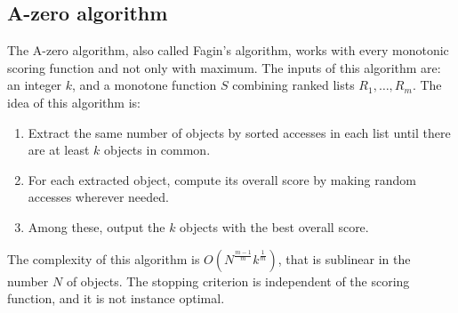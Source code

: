 \documentclass[12pt, a4paper]{report}
\newtheorem[style=M,bodystyle=\normalfont]{theorem}{Theorem}
\newtheorem[style=M,bodystyle=\normalfont]{corollary}{Corollary}
\newtheorem[style=M,bodystyle=\normalfont]{lemma}{Lemma}
\newtheorem[style=M,bodystyle=\normalfont]{definition}{Definition}
\begin{document}
    \subsection{A-zero algorithm}
    The A-zero algorithm, also called Fagin's algorithm, works with every monotonic scoring function and not only with maximum. The inputs
    of this algorithm are: an integer $k$, and a monotone function $S$ combining ranked lists $R_1,\dots,R_m$. The idea of this algorithm is: 
    \begin{enumerate}
        \item Extract the same number of objects by sorted accesses in each list until there are at least $k$ objects in common. 
        \item For each extracted object, compute its overall score by making random accesses wherever needed. 
        \item Among these, output the $k$ objects with the best overall score. 
    \end{enumerate}
    The complexity of this algorithm is $O(N^{\frac{m-1}{m}}k^{\frac{1}{m}})$, that is sublinear in the number $N$ of objects. The 
    stopping criterion is independent of the scoring function, and it is not instance optimal. 
\end{document}
